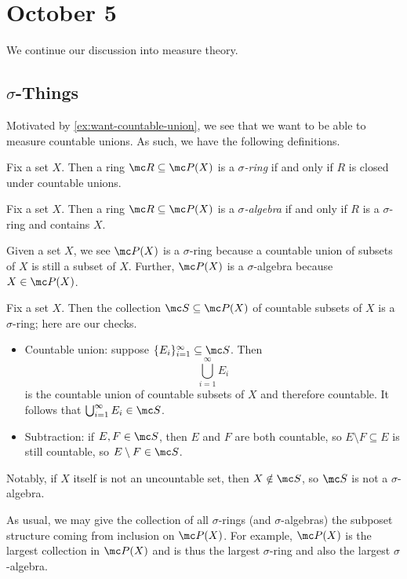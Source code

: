 \documentclass[../notes.tex]{subfiles}
\begin{document}
\section{October 5}

We continue our discussion into measure theory.

\subsection{\texorpdfstring{$\sigma$}{ Sigma}-Things}
Motivated by \autoref{ex:want-countable-union}, we see that we want to be able to measure countable unions. As such, we have the following definitions.
\begin{defihelper} 
	Fix a set $X$. Then a ring $\mc R\subseteq\mc P(X)$ is a \textit{$\sigma$-ring} if and only if $R$ is closed under countable unions.
\end{defihelper}
\begin{defihelper} 
	Fix a set $X$. Then a ring $\mc R\subseteq\mc P(X)$ is a \textit{$\sigma$-algebra} if and only if $R$ is a $\sigma$-ring and contains $X$.
\end{defihelper}
\begin{ex}
	Given a set $X$, we see $\mc P(X)$ is a $\sigma$-ring because a countable union of subsets of $X$ is still a subset of $X$. Further, $\mc P(X)$ is a $\sigma$-algebra because $X\in\mc P(X)$.
\end{ex}
\begin{example} \label{ex:countable-sigma-ring}
	Fix a set $X$. Then the collection $\mc S\subseteq\mc P(X)$ of countable subsets of $X$ is a $\sigma$-ring; here are our checks.
	\begin{itemize}
		\item Countable union: suppose $\{E_i\}_{i=1}^\infty\subseteq\mc S$. Then
		\[\bigcup_{i=1}^\infty E_i\]
		is the countable union of countable subsets of $X$ and therefore countable. It follows that $\bigcup_{i=1}^\infty E_i\in\mc S$.
		\item Subtraction: if $E,F\in\mc S$, then $E$ and $F$ are both countable, so $E\setminus F\subseteq E$ is still countable, so $E\setminus F\in\mc S$.
	\end{itemize}
	Notably, if $X$ itself is not an uncountable set, then $X\notin\mc S$, so $\mc S$ is not a $\sigma$-algebra.
\end{example}
As usual, we may give the collection of all $\sigma$-rings (and $\sigma$-algebras) the subposet structure coming from inclusion on $\mc P(X)$. For example, $\mc P(X)$ is the largest collection in $\mc P(X)$ and is thus the largest $\sigma$-ring and also the largest $\sigma$-algebra.
\end{document}
